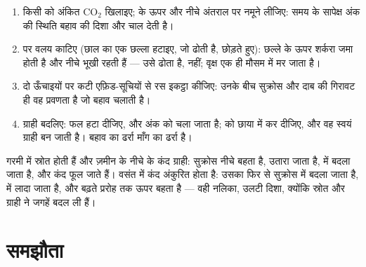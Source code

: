 \begin{method}[किसी स्थानांतरण प्रयोग को पढ़ना]\label{met:b1:plant-transport:translocation}
\begin{enumerate}
  \item किसी  को अंकित $\mathrm{CO_2}$ खिलाइए;  के ऊपर और नीचे
        अंतराल पर नमूने लीजिए: समय के सापेक्ष अंक की स्थिति बहाव की
        दिशा और चाल देती है।
  \item {} पर वलय काटिए (छाल का एक छल्ला हटाइए, जो  ढोती है,
         छोड़ते हुए): छल्ले के ऊपर शर्करा जमा होती है और नीचे
         भूखी रहती हैं --- उसे  ढोता है,  नहीं; वृक्ष एक
        ही मौसम में मर जाता है।
  \item दो ऊँचाइयों पर कटी एफ़िड-सूचियों से रस इकट्ठा कीजिए: उनके बीच
        सुक्रोस और दाब की गिरावट ही वह प्रवणता है जो बहाव चलाती है।
  \item ग्राही बदलिए: फल हटा दीजिए, और अंक  को चला जाता है; 
        को छाया में कर दीजिए, और वह स्वयं ग्राही बन जाती है। बहाव का
        ढर्रा माँग का ढर्रा है।
\end{enumerate}
\end{method}

\begin{example}[दो ऋतुओं में एक आलू]\label{ex:b1:plant-transport:potato}
गरमी में  स्रोत होती हैं और ज़मीन के नीचे के कंद ग्राही: सुक्रोस
नीचे बहता है, उतारा जाता है,  में बदला जाता है, और कंद फूल जाते हैं।
वसंत में कंद अंकुरित होता है: उसका  फिर से सुक्रोस में बदला जाता है,
 में लादा जाता है, और बढ़ते प्ररोह तक ऊपर बहता है --- वही नलिका,
उलटी दिशा, क्योंकि स्रोत और ग्राही ने जगहें बदल ली हैं।
\end{example}

\section{समझौता}

